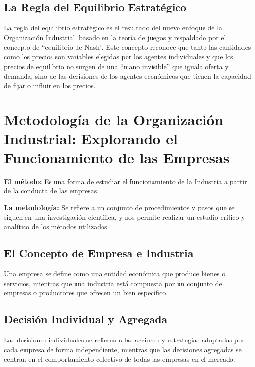\documentclass[
  doc,
  floatsintext,
  longtable,
  a4paper,
  nolmodern,
  notxfonts,
  notimes,
  12pt,
  colorlinks=true,linkcolor=blue,citecolor=blue,urlcolor=blue]{apa7}
\begin{document}
\subsection{La Regla del Equilibrio
Estratégico}\label{la-regla-del-equilibrio-estratuxe9gico}

La regla del equilibrio estratégico es el resultado del nuevo enfoque de
la Organización Industrial, basado en la teoría de juegos y respaldado
por el concepto de ``equilibrio de Nash''. Este concepto reconoce que
tanto las cantidades como los precios son variables elegidas por los
agentes individuales y que los precios de equilibrio no surgen de una
``mano invisible'' que iguala oferta y demanda, sino de las decisiones
de los agentes económicos que tienen la capacidad de fijar o influir en
los precios.

\section{Metodología de la Organización Industrial: Explorando el
Funcionamiento de las
Empresas}\label{metodologuxeda-de-la-organizaciuxf3n-industrial-explorando-el-funcionamiento-de-las-empresas}

\textbf{El método:} Es una forma de estudiar el funcionamiento de la
Industria a partir de la conducta de las empresas.

\textbf{La metodología:} Se refiere a un conjunto de procedimientos y
pasos que se siguen en una investigación científica, y nos permite
realizar un estudio crítico y analítico de los métodos utilizados.

\subsection{El Concepto de Empresa e
Industria}\label{el-concepto-de-empresa-e-industria}

Una empresa se define como una entidad económica que produce bienes o
servicios, mientras que una industria está compuesta por un conjunto de
empresas o productores que ofrecen un bien específico.

\subsection{Decisión Individual y
Agregada}\label{decisiuxf3n-individual-y-agregada}

Las decisiones individuales se refieren a las acciones y estrategias
adoptadas por cada empresa de forma independiente, mientras que las
decisiones agregadas se centran en el comportamiento colectivo de todas
las empresas en el mercado.
\end{document}
